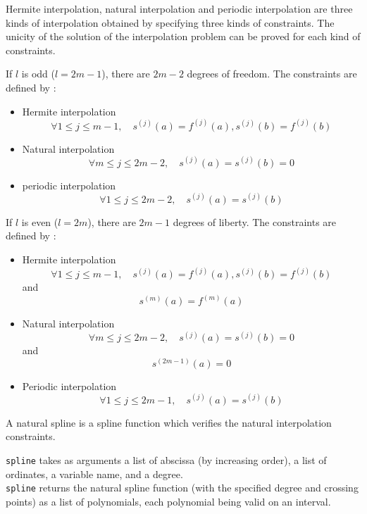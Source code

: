 \documentclass[a4paper,11pt]{book}
\begin{document}
Hermite interpolation, natural interpolation and periodic interpolation
are three kinds of interpolation obtained by specifying three kinds 
of constraints. The unicity of the  
solution of the interpolation problem can be proved
for each kind of constraints.

If $l$ is odd ($l=2m-1$), there are  $2m-2$ degrees of
freedom. The constraints are defined by :
\begin{itemize}
\item Hermite interpolation
\[ \forall 1\leq j\leq m-1, \quad s^{(j)}(a)=f^{(j)}(a),
s^{(j)}(b)=f^{(j)}(b) \]
\item  Natural interpolation
\[ \forall m \leq j \leq 2m-2, \quad s^{(j)}(a)=s^{(j)}(b)=0 \]
\item periodic interpolation 
\[\forall 1\leq j\leq 2m-2, \quad s^{(j)}(a)=s^{(j)}(b) \]
\end{itemize}

If $l$ is even ($l=2m$), there are $2m-1$ degrees of
liberty. The constraints are defined by :
\begin{itemize}
\item Hermite interpolation
\[ \forall 1\leq j\leq m-1, \quad s^{(j)}(a)=f^{(j)}(a),
s^{(j)}(b)=f^{(j)}(b) \] 
and
\[s^{(m)}(a)=f^{(m)}(a)\] 
\item Natural interpolation 
\[ \forall m \leq j \leq 2m-2, \quad s^{(j)}(a)=s^{(j)}(b)=0 \]
and
\[s^{(2m-1)}(a)=0\] 
\item  Periodic interpolation
\[\forall 1\leq j\leq 2m-1, \quad s^{(j)}(a)=s^{(j)}(b) \]
\end{itemize}
A natural spline 
is a spline function which verifies the natural interpolation constraints.

{\tt spline} takes as arguments a list of abscissa (by increasing order), 
a list of ordinates, a variable name, and a degree.\\
{\tt spline} returns the natural spline function (with the specified degree
and crossing points) as a list of polynomials, each 
polynomial being valid on an interval.
\end{document}
